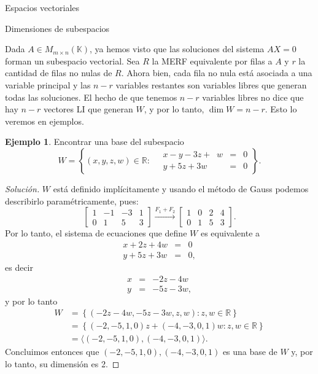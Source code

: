 \documentclass[a4paper,12pt,twoside,spanish]{amsbook}
\theoremstyle{definition}
\newtheorem{ejemplo}{Ejemplo}[section]
\theoremstyle{remark}
\newcommand{\K}{\mathbb K}
\begin{document}
\begin{chapter}{Espacios vectoriales}
	
	\begin{section}{Dimensiones de subespacios}\label{sec-dimensiones-de-subespacios}
		
			
		Dada $A \in M_{m\times n}(\K)$,  ya hemos visto que  las soluciones del sistema $AX=0$ forman un subespacio vectorial. Sea $R $ la MERF equivalente por filas a $A$ y $r$ la cantidad de filas no nulas de $R$. Ahora bien, cada fila no nula está asociada  a una  variable principal y las  $n-r$ variables restantes son variables libres  que generan  todas las soluciones.
		El  hecho de que tenemos $n-r$ variables libres no dice que hay $n-r$ vectores LI que generan $W$, y por lo tanto,  $\dim W = n-r$. Esto lo veremos en ejemplos.
		
		\begin{ejemplo}
			Encontrar una base del subespacio 
			$$
			W = \left\{(x,y,z,w) \in \mathbb{R}: \quad\begin{array}{rcl}
			x-y -3z +\;\;w &=& 0 \\ y +5z +3w &=& 0
			\end{array} \right\}.
			$$
		\end{ejemplo}
		\begin{proof}[Solución]
			$W$  está definido implícitamente y usando el método de Gauss podemos describirlo paramétricamente, pues:
			\begin{equation*}
			\begin{bmatrix}1&-1&-3&1 \\ 0&1&5&3  \end{bmatrix}
			\stackrel{F_1+F_2}{\longrightarrow} 
			\begin{bmatrix}1&0&2&4 \\ 0&1&5&3  \end{bmatrix}.
			\end{equation*}
			Por lo tanto, el sistema de ecuaciones que define $W$ es equivalente a 
			\begin{equation*}
			\begin{array}{rcl}
			x  +2z +4w &=& 0 \\ y +5z +3w &=& 0,
			\end{array}
			\end{equation*}
			es decir 
			\begin{equation*}
			\begin{array}{rcl}
			x  &=& -2z - 4w  \\ y &=& -5z -3w ,
			\end{array}
			\end{equation*}
			y por lo tanto
			\begin{align*}
			W &= \left\{(-2z -4w,-5z -3w,z,w) : z,w\in \mathbb{R} \right\} \\
			&= \left\{(-2,-5,1,0)z+(-4, -3,0,1)w : z,w\in \mathbb{R} \right\}\\
			&= \langle (-2,-5,1,0),(-4, -3,0,1)\rangle.
			\end{align*}
			Concluimos entonces que $(-2,-5,1,0),(-4, -3,0,1)$  es una base de $W$ y, por lo tanto,  su dimensión es 2.
		\end{proof}
		

\end{section}
\end{chapter}
\end{document}
